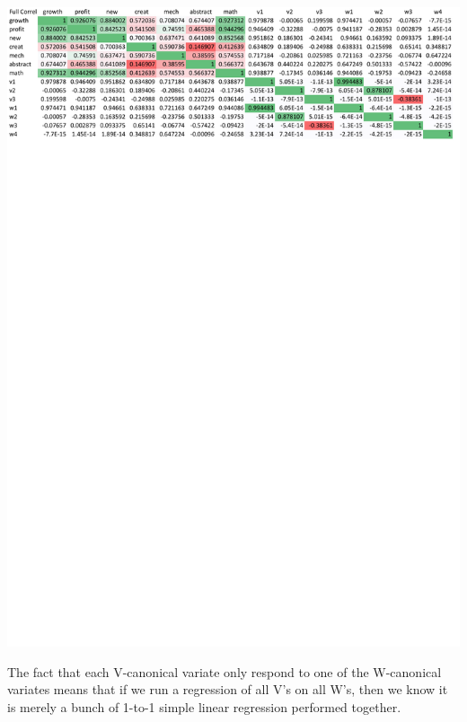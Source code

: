 \documentclass[article]{jss}
\begin{document}
        \begin{center}
          \vspace{-10pt}\includegraphics[width=\linewidth, keepaspectratio=true]{img/CanCorrSheetFullCorrel}
        \end{center}
        The fact that each V-canonical variate only respond to one of the W-canonical variates means that if we run a regression of all V's on all W's, then we know it is merely a bunch of 1-to-1 simple linear regression performed together.
        
\end{document}
